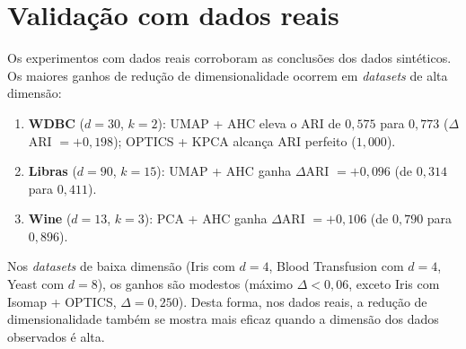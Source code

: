 \documentclass[12pt,a4paper]{report}
\begin{document}
\section*{Validação com dados reais}

Os experimentos com dados reais corroboram as conclusões dos dados sintéticos.
Os maiores ganhos de redução de dimensionalidade ocorrem em \textit{datasets}
de alta dimensão:
\begin{enumerate}
  \item \textbf{WDBC} ($d=30$, $k=2$): UMAP + AHC eleva o ARI de $0{,}575$
        para $0{,}773$ ($\Delta$ARI $= +0{,}198$); OPTICS + KPCA alcança
        ARI perfeito ($1{,}000$).
  \item \textbf{Libras} ($d=90$, $k=15$): UMAP + AHC ganha $\Delta$ARI
        $= +0{,}096$ (de $0{,}314$ para $0{,}411$).
  \item \textbf{Wine} ($d=13$, $k=3$): PCA + AHC ganha $\Delta$ARI
        $= +0{,}106$ (de $0{,}790$ para $0{,}896$).
\end{enumerate}
Nos \textit{datasets} de baixa dimensão (Iris com $d=4$, Blood Transfusion
com $d=4$, Yeast com $d=8$), os ganhos são modestos (máximo $\Delta < 0{,}06$,
exceto Iris com Isomap + OPTICS, $\Delta = 0{,}250$). Desta forma, nos dados
reais, a redução de dimensionalidade também se mostra mais eficaz quando a
dimensão dos dados observados é alta.
\end{document}
